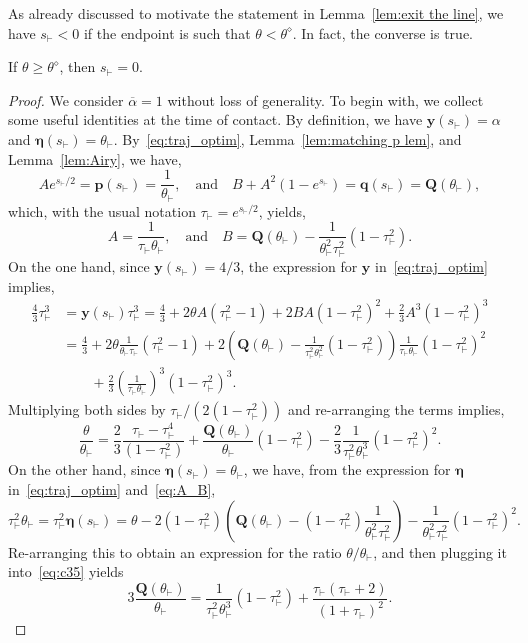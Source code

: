 \documentclass[AHL,Unicode,longabstracts]{cedram}
\newcommand{\bp}{\mathbf{p}}
\newcommand{\bq}{\mathbf{q}}
\newcommand{\bQ}{\mathbf{Q}}
\newcommand{\by}{\mathbf{y}}
\newcommand{\beeta}{\boldsymbol{\eta}}
\newcommand{\1}{\mathds{1}}
\newcommand{\sh}{s_{\vdash}}
\newcommand{\tauh}{\tau_{\vdash}}
\newcommand{\Thetastar}{\theta^{\diamond}}
\newcommand{\shh}{s_{\vdash}}
\newcommand{\tauhh}{\tau_{\vdash}}
\newcommand{\htheta}{\theta_{\vdash}}
\begin{document}
As already discussed to motivate the statement in Lemma~\ref{lem:exit the line}, we have $\shh<0$ if the endpoint is such that $\theta < \Thetastar$. In fact, the converse is true.

\begin{lemm}\label{lem:never leave}
If $\theta \geq \Thetastar$, then $\shh = 0$.
\end{lemm}


\begin{proof}
We consider $\overline{\alpha} = 1$ without loss of generality. To begin with, we collect some useful identities at the time of contact. By definition, we have $\by(\shh) = \alpha$ and $\beeta(\shh) = \htheta$. By~\eqref{eq:traj_optim}, Lemma~\ref{lem:matching p lem}, and Lemma~\ref{lem:Airy}, we have,
\[
A e^{\shh/2} = \bp(\shh) = \frac{1}{\htheta}, \quad \text{and}\quad B + A^2 \left(1 - e^{\shh}\right) =\bq(\shh) = \bQ(\htheta),
\]
which, with the usual notation $\tauhh = e^{\shh/2}$, yields,
\begin{equation}\label{eq:A_B}
A = \frac{1}{\tauhh\htheta}, \quad \text{and}\quad B= \bQ(\htheta) - \frac{1}{\htheta^2 \tauh^2}\left(1-\tauh^2\right).
\end{equation}
On the one hand, since $\by(\shh) = 4/3$, the expression for $\by$ in~\eqref{eq:traj_optim} implies,
\begin{equation*}
\begin{split}
\frac43 \tauh^3 &= \by(\sh) \tauh^{3} = \frac43 + 2\theta A\left(\tauh^2-1\right) + 2BA\left(1-\tauh^2\right)^2 + \frac{2}{3} A^3\left(1 - \tauh^2\right)^3\\
&=\frac43 + 2\theta \frac{1}{\htheta \tauh}\left(\tauh^2-1\right) + 2\left(\bQ(\htheta) - \frac{1}{\tauh^2 \htheta^2}\left(1 - \tauh^2\right)\right)\frac{1}{\tauh \htheta}\left(1-\tauh^2\right)^2
\\
& \qquad+ \frac{2}{3} \left(\frac{1}{\tauh \htheta}\right)^3\left(1 - \tauh^2\right)^3.
\end{split}
\end{equation*}
Multiplying both sides by $\tauh/(2(1-\tauh^2))$ and re-arranging the terms implies,
\begin{equation}\label{eq:c35}
\frac{\theta}{\htheta} = \frac{2}{3}\frac{\tauh - \tauh^4}{\left(1-\tauh^2\right)} + \frac{\bQ(\htheta)}{ \htheta}\left(1-\tauh^2\right) - \frac{2}{3} \frac{1}{\tauh^2 \htheta^3}\left(1 - \tauh^2\right)^2.
\end{equation}
On the other hand, since $\beeta(\sh) = \htheta$, we have, from the expression for $\beeta$ in~\eqref{eq:traj_optim} and~\eqref{eq:A_B},
\begin{equation*}
\tauh^2 \htheta = \tauh^2 \beeta(\sh) = \theta - 2\left(1-\tauh^2\right)\left(\bQ(\htheta) - \left(1 - \tauh^2\right)\frac{1}{\htheta^2 \tauh^2}\right) - \frac{1}{\htheta^2\tauh^2}\left(1-\tauh^2\right)^2.
\end{equation*}
Re-arranging this to obtain an expression for the ratio $\theta/\htheta$, and then plugging it into~\eqref{eq:c35} yields
\begin{equation}\label{eq:preliminary_W}
3\frac{\bQ(\htheta)}{\htheta} = \frac{1}{\tauh^2\htheta^3}\left(1-\tauh^2\right) + \frac{\tauh(\tauh+2)}{(1+\tauh)^2}.
\end{equation}


\end{proof}
\end{document}
